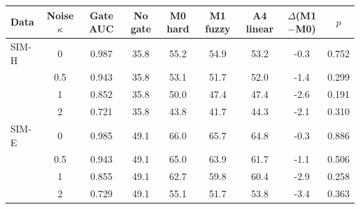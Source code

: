 \begin{tabular}{@{}lcccccccc@{}}
\toprule
Data & Noise $\kappa$ & Gate AUC & No gate & M0 hard & M1 fuzzy & A4 linear & $\Delta$(M1$-$M0) & $p$\\
\midrule
SIM-H & 0 & 0.987 & 35.8 & 55.2 & 54.9 & 53.2 & -0.3 & 0.752\\
 & 0.5 & 0.943 & 35.8 & 53.1 & 51.7 & 52.0 & -1.4 & 0.299\\
 & 1 & 0.852 & 35.8 & 50.0 & 47.4 & 47.4 & -2.6 & 0.191\\
 & 2 & 0.721 & 35.8 & 43.8 & 41.7 & 44.3 & -2.1 & 0.310\\
\midrule
SIM-E & 0 & 0.985 & 49.1 & 66.0 & 65.7 & 64.8 & -0.3 & 0.886\\
 & 0.5 & 0.943 & 49.1 & 65.0 & 63.9 & 61.7 & -1.1 & 0.506\\
 & 1 & 0.855 & 49.1 & 62.7 & 59.8 & 60.4 & -2.9 & 0.258\\
 & 2 & 0.729 & 49.1 & 55.1 & 51.7 & 53.8 & -3.4 & 0.363\\
\bottomrule
\end{tabular}
